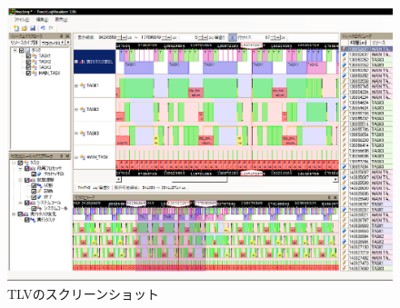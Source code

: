 \begin{figure}[!t]
\begin{center}
\includegraphics[scale=0.7]{TLVscreenshot.eps}
\caption{TLVのスクリーンショット}
\label{fig:TLVscreenshot}
\end{center}
\end{figure}





